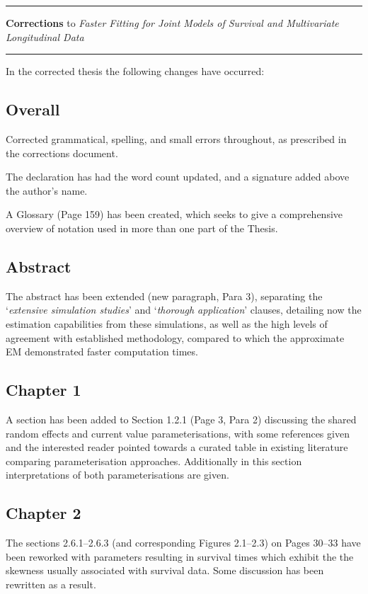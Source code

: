 \documentclass{article}
\begin{document}
\newcommand{\equote}[1]{`\textit{#1}'}

\hrule
\vspace{4pt}
\textbf{Corrections} to {\it Faster Fitting for Joint Models of Survival and Multivariate Longitudinal Data}\\
\vspace{-1pt}
\hrule

In the corrected thesis the following changes have occurred:
\subsection*{Overall}
Corrected grammatical, spelling, and small errors throughout, as prescribed in the corrections document.

The declaration has had the word count updated, and a signature added above the author's name.

A Glossary (Page 159) has been created, which seeks to give a comprehensive overview of notation used in more than one part of the Thesis.

\subsection*{Abstract}
The abstract has been extended (new paragraph, Para 3), separating the \equote{extensive simulation studies} and \equote{thorough application} clauses, detailing now the estimation capabilities from these simulations, as well as the high levels of agreement with established methodology, compared to which the approximate EM demonstrated faster computation times.

\subsection*{Chapter 1}
A section has been added to Section 1.2.1 (Page 3, Para 2) discussing the shared random effects  and current value parameterisations, with some references given and the interested reader pointed towards a curated table in existing literature comparing parameterisation approaches. Additionally in this section interpretations of both parameterisations are given.

\subsection*{Chapter 2}
The sections 2.6.1--2.6.3 (and corresponding Figures 2.1--2.3) on Pages 30--33 have been reworked with parameters resulting in survival times which exhibit the the skewness usually associated with survival data. Some discussion has been rewritten as a result.
\end{document}

